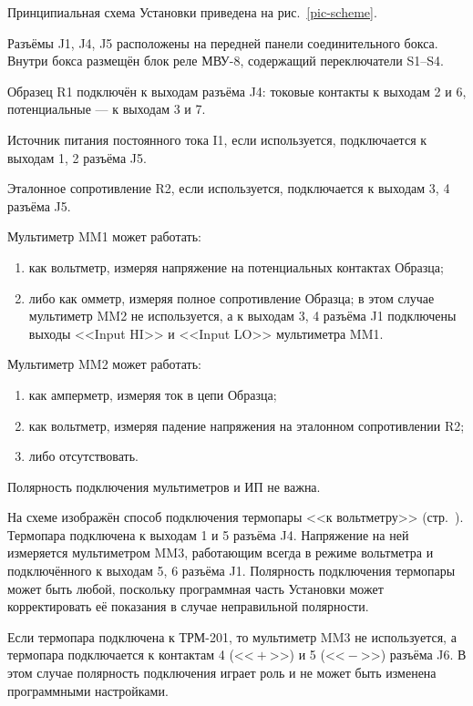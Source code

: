\documentclass[12pt, a4paper, twocolumn]{report}
\begin{document}
Принципиальная схема Установки приведена на рис.~\ref{pic-scheme}.

Разъёмы J1, J4, J5 расположены на передней панели соединительного бокса. Внутри бокса размещён блок реле МВУ-8, содержащий переключатели S1--S4.

Образец R1 подключён к выходам разъёма J4: токовые контакты к выходам 2 и 6, потенциальные --- к выходам 3 и 7.

Источник питания постоянного тока I1, если используется, подключается к выходам 1, 2 разъёма J5.

Эталонное сопротивление R2, если используется, подключается к выходам 3, 4 разъёма J5.

Мультиметр MM1 может работать:

\begin{enumerate}
\item как вольтметр, измеряя напряжение на потенциальных контактах Образца;
\item либо как омметр, измеряя полное сопротивление Образца; в этом случае мультиметр MM2 не используется, а к выходам 3, 4 разъёма J1 подключены выходы <<Input HI>> и <<Input LO>> мультиметра MM1.
\end{enumerate}

Мультиметр MM2 может работать:

\begin{enumerate}
\item как амперметр, измеряя ток в цепи Образца;
\item как вольтметр, измеряя падение напряжения на эталонном сопротивлении R2;
\item либо отсутствовать.
\end{enumerate}

Полярность подключения мультиметров и ИП не важна.

На схеме изображён способ подключения термопары <<к вольтметру>> (стр.~\pageref{sec_t_measures}). Термопара подключена к выходам 1 и 5 разъёма J4. Напряжение на ней измеряется мультиметром MM3, работающим всегда в режиме вольтметра и подключённого к выходам 5, 6 разъёма J1. Полярность подключения термопары может быть любой, поскольку программная часть Установки может корректировать её показания в случае неправильной полярности.

Если термопара подключена к ТРМ-201, то мультиметр MM3 не используется, а термопара подключается к контактам 4 (<<${}+{}$>>) и 5 (<<${}-{}$>>) разъёма J6. В этом случае полярность подключения играет роль и не может быть изменена программными настройками.
\end{document}
